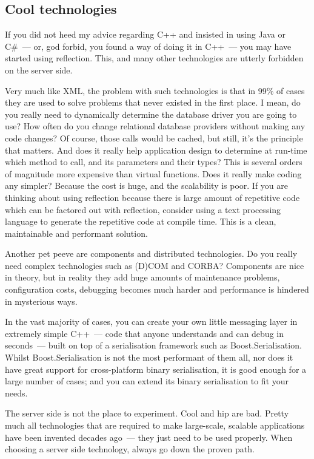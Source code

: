 \documentclass{book}
\begin{document}
\subsection{Cool technologies}

If you did not heed my advice regarding C++ and insisted in using Java
or C\#~--- or, god forbid, you found a way of doing it in C++~--- you
may have started using reflection. This, and many other technologies
are utterly forbidden on the server side.

Very much like XML, the problem with such technologies is that in 99\%
of cases they are used to solve problems that never existed in the
first place. I mean, do you really need to dynamically determine the
database driver you are going to use? How often do you change
relational database providers without making any code changes? Of
course, those calls would be cached, but still, it's the principle
that matters. And does it really help application design to determine
at run-time which method to call, and its parameters and their types?
This is several orders of magnitude more expensive than virtual
functions. Does it really make coding any simpler? Because the cost is
huge, and the scalability is poor. If you are thinking about using
reflection because there is large amount of repetitive code which can
be factored out with reflection, consider using a text processing
language to generate the repetitive code at compile time. This is a
clean, maintainable and performant solution.

Another pet peeve are components and distributed technologies. Do you
really need complex technologies such as (D)COM and CORBA? Components
are nice in theory, but in reality they add huge amounts of
maintenance problems, configuration costs, debugging becomes much
harder and performance is hindered in mysterious ways.

In the vast majority of cases, you can create your own little
messaging layer in extremely simple C++~--- code that anyone
understands and can debug in seconds~--- built on top of a
serialisation framework such as Boost.Serialisation. Whilst
Boost.Serialisation is not the most performant of them all, nor does
it have great support for cross-platform binary serialisation, it is
good enough for a large number of cases; and you can extend its binary
serialisation to fit your needs.

The server side is not the place to experiment. Cool and hip are
bad. Pretty much all technologies that are required to make
large-scale, scalable applications have been invented decades ago~---
they just need to be used properly. When choosing a server side
technology, always go down the proven path.
\end{document}
